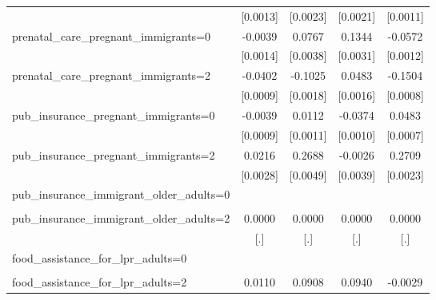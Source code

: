 \begin{table}[htbp]
\begin{tabular}{l*{4}{c}}
                    &    [0.0013]         &    [0.0023]         &    [0.0021]         &    [0.0011]         \\
\addlinespace
prenatal\_care\_pregnant\_immigrants=0&     -0.0039\sym{***}&      0.0767\sym{***}&      0.1344\sym{***}&     -0.0572\sym{***}\\
                    &    [0.0014]         &    [0.0038]         &    [0.0031]         &    [0.0012]         \\
\addlinespace
prenatal\_care\_pregnant\_immigrants=2&     -0.0402\sym{***}&     -0.1025\sym{***}&      0.0483\sym{***}&     -0.1504\sym{***}\\
                    &    [0.0009]         &    [0.0018]         &    [0.0016]         &    [0.0008]         \\
\addlinespace
pub\_insurance\_pregnant\_immigrants=0&     -0.0039\sym{***}&      0.0112\sym{***}&     -0.0374\sym{***}&      0.0483\sym{***}\\
                    &    [0.0009]         &    [0.0011]         &    [0.0010]         &    [0.0007]         \\
\addlinespace
pub\_insurance\_pregnant\_immigrants=2&      0.0216\sym{***}&      0.2688\sym{***}&     -0.0026         &      0.2709\sym{***}\\
                    &    [0.0028]         &    [0.0049]         &    [0.0039]         &    [0.0023]         \\
\addlinespace
pub\_insurance\_immigrant\_older\_adults=0&                     &                     &                     &                     \\
                    &                     &                     &                     &                     \\
\addlinespace
pub\_insurance\_immigrant\_older\_adults=2&      0.0000         &      0.0000         &      0.0000         &      0.0000         \\
                    &         [.]         &         [.]         &         [.]         &         [.]         \\
\addlinespace
food\_assistance\_for\_lpr\_adults=0&                     &                     &                     &                     \\
                    &                     &                     &                     &                     \\
\addlinespace
food\_assistance\_for\_lpr\_adults=2&      0.0110\sym{***}&      0.0908\sym{***}&      0.0940\sym{***}&     -0.0029\sym{***}\\

\end{tabular}
\end{table}
